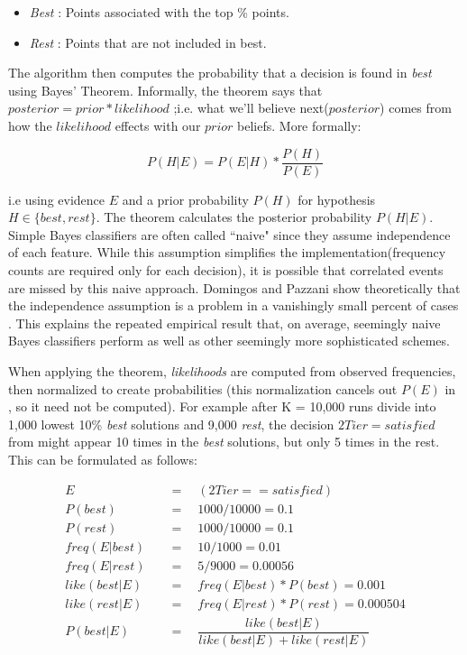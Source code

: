 \begin{itemize}
    \item \textit{Best} : Points associated with the top \% points.
    \item \textit{Rest} : Points that are not included in best.
\end{itemize}

The algorithm then computes the probability that a decision is found in \textit{best} using Bayes' Theorem. Informally, the theorem says that $posterior = prior * likelihood$ ;i.e. what we'll believe next($posterior$) comes from how the $likelihood$ effects with our $prior$ beliefs. More formally:

\begin{equation}
    P(H|E) = P(E|H) * \dfrac{P(H)}{P(E)}
    \label{eq:bayes}
\end{equation}

i.e using evidence $E$ and a prior probability $P(H)$ for hypothesis $H \in \{best, rest\}$. The theorem calculates the posterior probability $P(H|E)$. Simple Bayes classifiers are often called ``naive" since they assume independence of each feature. While this assumption simplifies the implementation(frequency counts are required only for each decision), it is possible that correlated events are missed by this naive approach. Domingos and Pazzani show theoretically that the independence assumption is a problem in a vanishingly small percent of cases \cite{domingos97}. This explains the repeated empirical result that, on average, seemingly naive Bayes classifiers perform as well as other seemingly more sophisticated schemes.

When applying the theorem, \textit{likelihoods} are computed from observed frequencies, then normalized to create probabilities (this normalization cancels out $P(E)$ in , so it need not be computed). For example after K = 10,000 runs divide into 1,000 lowest 10\% \textit{best} solutions and 9,000 \textit{rest}, the decision $2Tier = satisfied$ from  might appear 10 times in the \textit{best} solutions, but only 5 times in the rest. This can be formulated as follows:

\begin{equation}
    \begin{aligned}
        E &\quad =\quad (2Tier == satisfied) \\
        P(best) &\quad =\quad 1000 / 10000 = 0.1 \\
        P(rest) &\quad =\quad 1000 / 10000 = 0.1 \\
        freq(E|best) &\quad =\quad 10/1000 = 0.01 \\
        freq(E|rest) &\quad =\quad 5/9000 = 0.00056 \\
        like(best|E) &\quad =\quad freq(E|best) * P(best) = 0.001\\
        like(rest|E) &\quad =\quad freq(E|rest) * P(rest) = 0.000504\\
        P(best|E) &\quad =\quad \dfrac{like(best|E)}{like(best|E) + like(rest|E)}
    \end{aligned}
    \label{eq:posterior}
\end{equation}

